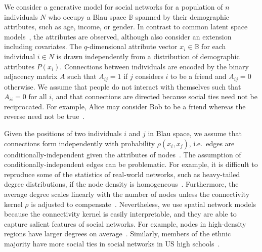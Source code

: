 \documentclass{scrartcl}
\newcommand{\population}{N}
\newcommand{\seeds}{U}
\newcommand{\nominees}{V}
\newcommand{\blauspace}{\mathbb{B}}
\begin{document}
We consider a generative model for social networks for a population of $n$ individuals $\population$ who occupy a Blau space $\blauspace$ spanned by their demographic attributes, such as age, income, or gender. In contrast to common latent space models~\cite{Hoff2002, Hoff2008, Handcock2007}, the attributes are observed, although \textcite{Hoff2002} also consider an extension including covariates. The $q$-dimensional attribute vector $x_i\in\blauspace$ for each individual $i\in \population$ is drawn independently from a distribution of demographic attributes $P(x_i)$. Connections between individuals are encoded by the binary adjacency matrix $A$ such that $A_{ij}=1$ if $j$ considers $i$ to be a friend and $A_{ij}=0$ otherwise. We assume that people do not interact with themselves such that $A_{ii}=0$ for all $i$, and that connections are directed because social ties need not be reciprocated. For example, Alice may consider Bob to be a friend whereas the reverse need not be true~\cite{Ball2013}.

Given the positions of two individuals $i$ and $j$ in Blau space, we assume that connections form independently with probability $\rho(x_i, x_j)$, i.e.\ edges are conditionally-independent given the attributes of nodes~\cite{Fienberg2012}. The assumption of conditionally-independent edges can be problematic. For example, it is difficult to reproduce some of the statistics of real-world networks, such as heavy-tailed degree distributions, if the node density is homogeneous~\cite{Barnett2007}. Furthermore, the average degree scales linearly with the number of nodes unless the connectivity kernel $\rho$ is adjusted to compensate~\cite{Caron2017}. Nevertheless, we use spatial network models because the connectivity kernel is easily interpretable, and they are able to capture salient features of social networks. For example, nodes in high-density regions have larger degrees on average~\cite{Barnett2007}. Similarly, members of the ethnic majority have more social ties in social networks in US high schools~\cite{Currarini2009}.

\end{document}

